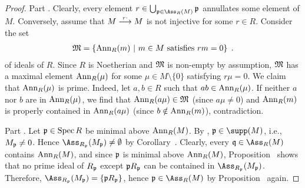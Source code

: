 \documentclass[a4paper,parskip=half,numbers=enddot, DIV=12]{scrreprt}
\begin{document}
\begin{proof}
	Part . Clearly, every element $r\in \bigcup_{\pp\in \Ass_R(M)}\pp$ annullates some element of $M$. Conversely, assume that $M\morphism[\smash{r\cdot}]M$ is not injective for some $r\in R$. Consider the set
	\begin{align*}
		\mathfrak{M}=\left\{\operatorname{Ann}_R(m)\ \middle|\  m\in M\text{ satisfies }rm=0\right\}\;.
	\end{align*}
	of ideals of $R$. Since $R$ is Noetherian and $\mathfrak{M}$ is non-empty by assumption, $\mathfrak{M}$ has a maximal element $\operatorname{Ann}_R(\mu)$ for some $\mu\in M\setminus\{0\}$ satisfying $r\mu=0$. We claim that $\operatorname{Ann}_R(\mu)$ is prime. Indeed, let $a,b\in R$ such that $ab\in \operatorname{Ann}_R(\mu)$. If neither $a$ nor $b$ are in $\operatorname{Ann}_R(\mu)$, we find that $\operatorname{Ann}_R(a\mu)\in\mathfrak{M}$ (since $a\mu\neq 0$) and $\operatorname{Ann}_R(m)$ is properly contained in $\operatorname{Ann}_R(a\mu)$ (since $b\notin\operatorname{Ann}_R(m)$), contradiction.
	
	Part . Let $\mathfrak{p}\in\operatorname{Spec} R$ be minimal above $\operatorname{Ann}_R(M)$. By \cite[Lemma~3.4.1]{alg2}, $\pp\in\supp(M)$, i.e., $M_{\mathfrak{p}}\neq 0$. Hence $\Ass_{R_\pp}(M_\pp)\neq\emptyset$ by Corollary~. Clearly, every $\qq\in\Ass_R(M)$ contains $\operatorname{Ann}_R(M)$, and since $\mathfrak{p}$ is minimal above $\operatorname{Ann}_R(M)$, Proposition~ shows that no prime ideal of $R_{\mathfrak{p}}$ except $\mathfrak{p} R_{\mathfrak{p}}$ can be contained in $\Ass_{R_\pp}(M_\pp)$. Therefore, $\Ass_{R_\pp}(M_\pp)=\{\pp R_\pp\}$, hence $\pp\in\Ass_R(M)$ by Proposition~ again.
\end{proof}


\printbibliography
\end{document}
